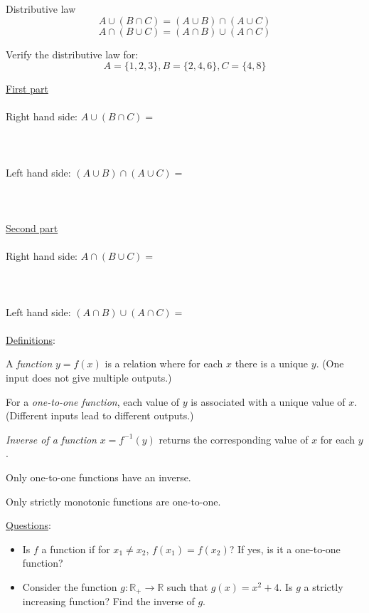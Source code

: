 \documentclass{./../../Latex/handout}
\begin{document}
\thispagestyle{plain}
\newcommand{\mytitle}{Sets and Functions}
\myheader{\mytitle}

\vspace{0.5em}
Distributive law
$$ A \cup (B \cap C) = (A \cup B) \cap (A \cup C) $$
$$ A \cap (B \cup C) = (A \cap B) \cup (A \cap C) $$

\vspace{1em}

Verify the distributive law for:
$$ A = \{1,2,3\}, B = \{2,4,6\}, C=\{4,8\} $$

\underline{First part} \\~\\
Right hand side: $ A \cup (B \cap C) = $  \\~\\
\\~\\
Left hand side: $ (A \cup B) \cap (A \cup C) = $ \\~\\
\\~\\
\underline{Second part} \\~\\
Right hand side: $ A \cap (B \cup C) = $  \\~\\
\\~\\
Left hand side: $ (A \cap B) \cup (A \cap C) = $ \\~\\

\newpage
\underline{Definitions}:
\begin{witemize}
	\item A \textit{function} $y=f(x)$ is a relation where for each $x$ there is a unique $y$. (One input does not give multiple outputs.)
	\item For a \textit{one-to-one function}, each value of $y$ is associated with a unique value of $x$. (Different inputs lead to different outputs.)
	\item \textit{Inverse of a function} $x=f^{-1}(y)$ returns the corresponding value of $x$ for each $y$. 
	\item Only one-to-one functions have an inverse.
	\item Only strictly monotonic functions are one-to-one.
\end{witemize}
\vspace{1cm}
\underline{Questions}:
\begin{itemize}
	\item Is $f$ a function if for $ x_1 \neq x_2 $, $f(x_1) = f(x_2)$? If yes, is it a one-to-one function? \\ \vspace{3cm}
	\item Consider the function $g: \mathbb{R}_{+} \rightarrow \mathbb{R}$ such that $g(x) = x^2 + 4 $. Is $g$ a strictly increasing function? Find the inverse of $g$. 
\end{itemize}
\end{document}
